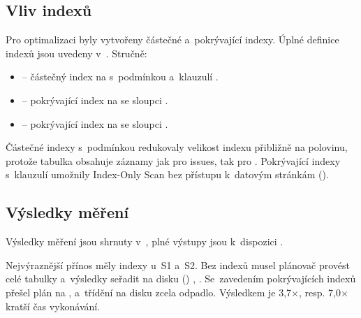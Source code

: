 \subsection{Vliv indexů}
\label{subsec:evaluace:sql:indexy}

Pro optimalizaci byly vytvořeny částečné a~pokrývající indexy. Úplné definice indexů jsou uvedeny v~. Stručně:

\begin{itemize}
  \item {} -- částečný index na  s~podmínkou  a~klauzulí .
  \item {} -- pokrývající index na  se sloupci .
  \item {} -- pokrývající index na  se sloupci .
\end{itemize}

Částečné indexy s~podmínkou  redukovaly velikost indexu přibližně na polovinu, protože tabulka obsahuje záznamy jak pro issues, tak pro \PR. Pokrývající indexy s~klauzulí  umožnily Index-Only Scan bez přístupu k~datovým stránkám ().

\subsection{Výsledky měření}
\label{subsec:evaluace:sql:vysledky}

Výsledky měření jsou shrnuty v~, plné výstupy  jsou k~dispozici .

Nejvýraznější přínos měly indexy u~S1 a~S2. Bez indexů musel plánovač provést  celé tabulky a~výsledky seřadit na disku () , .
Se~zavedením pokrývajících indexů přešel plán na  ,  a~třídění na disku zcela odpadlo.
Výsledkem je 3,7$\times$, resp. 7,0$\times$ kratší čas vykonávání.

